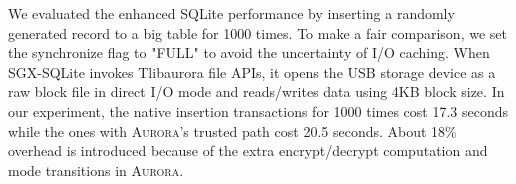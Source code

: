 We evaluated the enhanced SQLite performance by inserting a randomly generated record to a big table for 1000 times. To make a fair comparison, we set the synchronize flag to "FULL" to avoid the uncertainty of I/O caching. When SGX-SQLite invokes Tlibaurora file APIs, it opens the USB storage device as a raw block file in direct I/O mode and reads/writes data using 4KB block size. In our experiment, the native insertion transactions for 1000 times cost 17.3 seconds while the ones with \textsc{Aurora}'s trusted path cost 20.5 seconds. About 18\% overhead is introduced because of the extra encrypt/decrypt computation and mode transitions in \textsc{Aurora}. %

%

